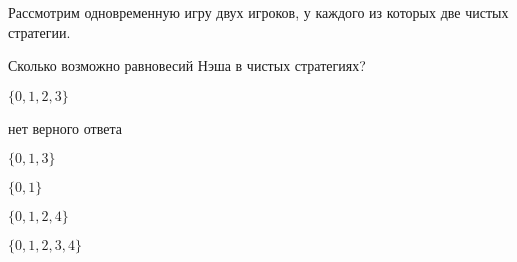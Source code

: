 
\begin{question}
Рассмотрим одновременную игру двух игроков, у каждого из которых две
чистых стратегии.

Сколько возможно равновесий Нэша в чистых стратегиях?
\begin{answerlist}
  \item \(\{0, 1, 2, 3\}\)
  \item нет верного ответа
  \item \(\{0, 1, 3 \}\)
  \item \(\{0, 1\}\)
  \item \(\{0, 1, 2, 4\}\)
  \item \(\{0, 1, 2, 3, 4\}\)
\end{answerlist}
\end{question}


